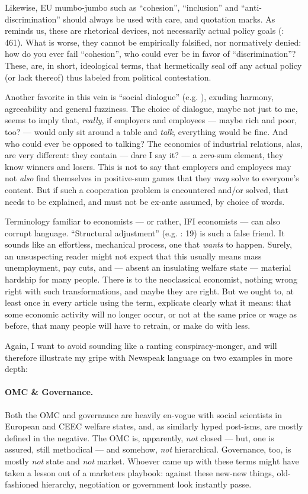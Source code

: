 \documentclass[11pt,a4paper,oneside,openright]{article}
\begin{document}
Likewise, \gls{EU} mumbo-jumbo such as ``cohesion'', ``inclusion'' and ``anti-discrimination'' should always be used with care, and quotation marks. As \citeauthor{Offe2003} reminds us, these are rhetorical devices, not necessarily actual policy goals (\citeyear{Offe2003}: 461). What is worse, they cannot be empirically falsified, nor normatively denied: how do you ever fail ``cohesion'', who could ever be in favor of ``discrimination''? These, are, in short, ideological terms, that hermetically seal off any actual policy (or lack thereof) thus labeled from political contestation.

Another favorite in this vein is ``social dialogue'' (e.g. \citealt{Durr2009}), exuding harmony, agreeability and general fuzziness. The choice of dialogue, maybe not just to me, seems to imply that, \emph{really}, if employers and employees --- maybe rich and poor, too? --- would only sit around a table and \emph{talk}, everything would be fine. And who could ever be opposed to talking? The economics of industrial relations, alas, are very different: they contain --- dare I say it? --- a \emph{zero}-sum element, they know winners and losers. This is not to say that employers and employees may not \emph{also} find themselves in positive-sum games that they \emph{may} solve to everyone's content. But if such a cooperation problem is encountered and/or solved, that needs to be explained, and must not be ex-ante assumed, by choice of words.

Terminology familiar to economists --- or rather, \gls{IFI} economists --- can also corrupt language. ``Structural adjustment'' (e.g. \citealt{Begg2008}: 19) is such a false friend. It sounds like an effortless, mechanical process, one that \emph{wants} to happen. Surely, an unsuspecting reader might not expect that this usually means mass unemployment, pay cuts, and --- absent an insulating welfare state --- material hardship for many people. There is to the neoclassical economist, nothing wrong right with such transformations, and maybe they are right. But we ought to, at least once in every article using the term, explicate clearly what it means: that some economic activity will no longer occur, or not at the same price or wage as before, that many people will have to retrain, or make do with less.

Again, I want to avoid sounding like a ranting conspiracy-monger, and will therefore illustrate my gripe with Newspeak language on two examples in more depth:

\paragraph{\gls{OMC} \& Governance.} Both the \gls{OMC} and governance are heavily en-vogue with social scientists in European and \gls{CEEC} welfare states, and, as similarly hyped post-isms, are mostly defined in the negative. The \gls{OMC} is, apparently, \emph{not} closed --- but, one is assured, still methodical --- and somehow, \emph{not} hierarchical. Governance, too, is mostly \emph{not} state and \emph{not} market. Whoever came up with these terms might have taken a lesson out of a marketers playbook: against these new-new things, old-fashioned hierarchy, negotiation or government look instantly passe. 
\end{document}
